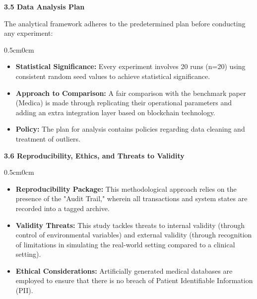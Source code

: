 \documentclass[12pt, a4paper]{report}
\begin{document}
\vspace{0.5cm}
{\color{myblue} \Large \bfseries 3.5 Data Analysis Plan}

\noindent The analytical framework adheres to the predetermined plan before conducting any experiment:

\begin{adjustwidth} {0.5cm}{0cm}
\vspace{-1.0em}
\begin{itemize}[nosep, topsep=0pt, partopsep=0pt]
    \item \textbf{Statistical Significance:} Every experiment involves 20 runs (n=20) using consistent random seed values to achieve statistical significance.
    \item \textbf{Approach to Comparison:} A fair comparison with the benchmark paper (Medica) is made through replicating their operational parameters and adding an extra integration layer based on blockchain technology.
    \item \textbf{Policy:} The plan for analysis contains policies regarding data cleaning and treatment of outliers.
\end{itemize}
\end{adjustwidth}


\vspace{0.5cm}
{\color{myblue} \Large \bfseries 3.6 Reproducibility, Ethics, and Threats to Validity}

\begin{adjustwidth} {0.5cm}{0cm}

\begin{itemize}[nosep, topsep=0pt, partopsep=0pt]
    \item \textbf{Reproducibility Package:} This methodological approach relies on the presence of the "Audit Trail," wherein all transactions and system states are recorded into a tagged archive.
    \item \textbf{Validity Threats:} This study tackles threats to internal validity (through control of environmental variables) and external validity (through recognition of limitations in simulating the real-world setting compared to a clinical setting).
    \item \textbf{Ethical Considerations:} Artificially generated medical databases are employed to ensure that there is no breach of Patient Identifiable Information (PII).
\end{itemize}
\end{adjustwidth}
\end{document}
